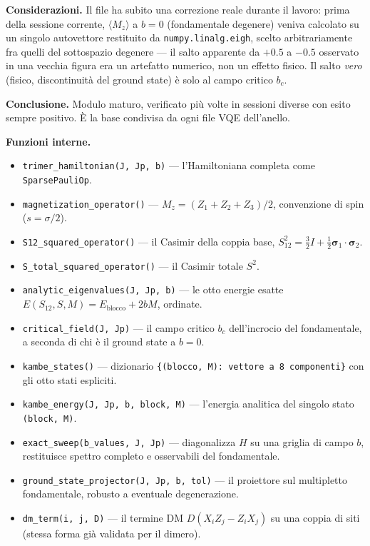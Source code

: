 \documentclass[11pt,a4paper]{article}
\begin{document}
\textbf{Considerazioni.} Il file ha subito una correzione reale durante il lavoro:
prima della sessione corrente, $\langle M_z\rangle$ a $b=0$ (fondamentale degenere)
veniva calcolato su un singolo autovettore restituito da \texttt{numpy.linalg.eigh},
scelto arbitrariamente fra quelli del sottospazio degenere — il salto apparente da
$+0.5$ a $-0.5$ osservato in una vecchia figura era un artefatto numerico, non un
effetto fisico. Il salto \emph{vero} (fisico, discontinuità del ground state) è solo
al campo critico $b_c$.

\textbf{Conclusione.} Modulo maturo, verificato più volte in sessioni diverse con
esito sempre positivo. È la base condivisa da ogni file VQE dell'anello.

\textbf{Funzioni interne.}
\begin{itemize}
\item \texttt{trimer\_hamiltonian(J,\ Jp,\ b)} — l'Hamiltoniana completa come
\texttt{SparsePauliOp}.
\item \texttt{magnetization\_operator()} — $M_z=(Z_1+Z_2+Z_3)/2$, convenzione di
spin ($s=\sigma/2$).
\item \texttt{S12\_squared\_operator()} — il Casimir della coppia base,
$S_{12}^2=\tfrac32 I+\tfrac12\boldsymbol\sigma_1\cdot\boldsymbol\sigma_2$.
\item \texttt{S\_total\_squared\_operator()} — il Casimir totale $S^2$.
\item \texttt{analytic\_eigenvalues(J,\ Jp,\ b)} — le otto energie esatte
$E(S_{12},S,M)=E_\text{blocco}+2bM$, ordinate.
\item \texttt{critical\_field(J,\ Jp)} — il campo critico $b_c$ dell'incrocio del
fondamentale, a seconda di chi è il ground state a $b=0$.
\item \texttt{kambe\_states()} — dizionario \texttt{\{(blocco, M): vettore a 8
componenti\}} con gli otto stati espliciti.
\item \texttt{kambe\_energy(J,\ Jp,\ b,\ block,\ M)} — l'energia analitica del
singolo stato \texttt{(block, M)}.
\item \texttt{exact\_sweep(b\_values,\ J,\ Jp)} — diagonalizza $H$ su una griglia di
campo $b$, restituisce spettro completo e osservabili del fondamentale.
\item \texttt{ground\_state\_projector(J,\ Jp,\ b,\ tol)} — il proiettore sul
multipletto fondamentale, robusto a eventuale degenerazione.
\item \texttt{dm\_term(i,\ j,\ D)} — il termine DM $D(X_iZ_j-Z_iX_j)$ su una coppia
di siti (stessa forma già validata per il dimero).

\end{itemize}
\end{document}
